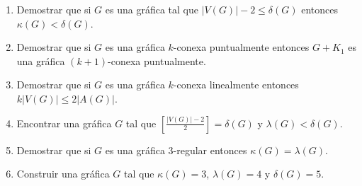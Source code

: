 \documentclass[12pt]{report}
\newcommand{\R}{\mathbb R}
\newcommand{\Z}{\mathbb Z}
\newcommand{\N}{\mathbb N}
\begin{document}
\begin{enumerate}
%
\item Demostrar que si $G$ es una gráfica tal que $|V(G)|-2 \leq \delta(G)$ entonces $\kappa(G) < \delta(G)$.
%

\item Demostrar que si $G$ es una gráfica $k$-conexa puntualmente entonces $G+K_1$ es una gráfica $(k+1)$-conexa puntualmente.


\item Demostrar que si $G$ es una gráfica $k$-conexa linealmente entonces $ k |V(G)| \leq 2 |A(G)|$.


\item Encontrar una gráfica $G$ tal que $\left[\frac{|V(G)|-2}{2}\right] = \delta(G)$ y $\lambda(G) < \delta(G)$.

\item Demostrar que si $G$ es una gráfica $3$-regular entonces $\kappa(G) = \lambda(G)$.


\item Construir una gráfica $G$ tal que $\kappa(G) =3$, $\lambda (G) = 4$ y $\delta(G) =5$.

\end{enumerate}
\end{document}

